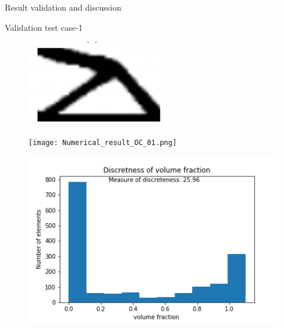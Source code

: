 \documentclass[a4paper,12pt,times]{article}
\begin{document}
\begin{section}{Result validation and discussion}
\begin{subsection}{Validation test case-1}
\begin{figure}[H]
	\centering
	\begin{minipage}{.5\textwidth}
		\centering
		\includegraphics[width=1\linewidth]{analytical_OC_1.png}
		\label{VC-02.1}
	\end{minipage}%
	\begin{minipage}{.5\textwidth}
		\centering
		\texttt{[image: Numerical\_result\_OC\_01.png]}
		\label{VC-02.2}
	\end{minipage}
\end{figure} 
\begin{figure}[H]
	\centering
	\begin{minipage}{.5\textwidth}
		\centering
		\includegraphics[width=1\linewidth]{OC_01_discretness.png}

\end{minipage}
\end{figure}
\end{subsection}
\end{section}
\end{document}
